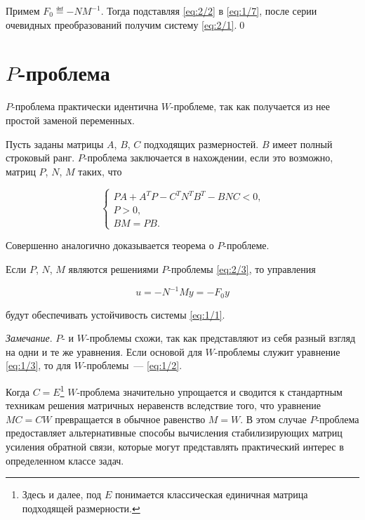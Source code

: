 \begin{flushleft}
Примем $F_0 \eqdef -NM^{-1}$. Тогда подставляя \vref{eq:2/2} в \vref{eq:1/7}, после серии очевидных преобразований получим систему \ref{eq:2/1}.\qed
\end{flushleft}




\section{$P$-проблема}

$P$-проблема практически идентична $W$-проблеме, так как получается из нее простой заменой переменных.

Пусть заданы матрицы $A$, $B$, $C$ подходящих размерностей. $B$ имеет полный строковый ранг. $P$-проблема заключается в нахождении, если это возможно, матриц $P$, $N$, $M$ таких, что

\begin{equation}
\label{eq:2/3}
\left\{ \begin{array}{l}
         PA + A^TP - C^TN^TB^T - BNC < 0\mbox{,} \\
         P > 0\mbox{,} \\
         BM = PB\mbox{.}
        \end{array}
\right.
\end{equation}

Совершенно аналогично доказывается теорема о $P$-проблеме.

\begin{teo}
\label{teo:2/2}
Если $P$, $N$, $M$ являются решениями $P$-проблемы \vref{eq:2/3}, то управления

$$
u = -N^{-1}My = -F_0y
$$

\begin{flushleft}
будут обеспечивать устойчивость системы \vref{eq:1/1}.
\end{flushleft}
\end{teo}

\emph{Замечание}. $P$- и $W$-проблемы схожи, так как представляют из себя разный взгляд на одни и те же уравнения. Если основой для $W$-проблемы служит уравнение \vref{eq:1/3}, то для $W$-проблемы~--- \vref{eq:1/2}.\br

Когда $C=E$\footnote{Здесь и далее, под $E$ понимается классическая единичная матрица подходящей размерности.} $W$-проблема значительно упрощается и сводится к стандартным техникам решения матричных неравенств вследствие того, что уравнение $MC=CW$ превращается в обычное равенство $M=W$. В этом случае $P$-проблема предоставляет альтернативные способы вычисления стабилизирующих матриц усиления обратной связи, которые могут представлять практический интерес в определенном классе задач\cite{CRUSIUS}.


